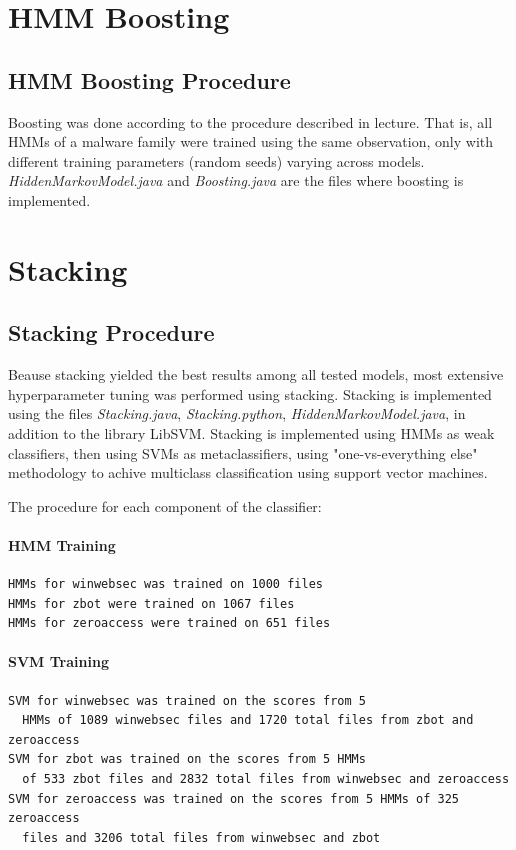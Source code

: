 \documentclass[12pt]{article}
\begin{document}
\section{HMM Boosting}
  \subsection{HMM Boosting Procedure}
  Boosting was done according to the procedure described in lecture. That is, all HMMs of a malware family were trained using the same observation, only with different training parameters (random seeds) varying across models. \textit{HiddenMarkovModel.java} and \textit{Boosting.java} are the files where boosting is implemented.
 
\section{Stacking}
  \subsection{Stacking Procedure}
  Beause stacking yielded the best results among all tested models, most extensive hyperparameter tuning was performed using stacking. Stacking is implemented using the files \textit{Stacking.java}, \textit{Stacking.python}, \textit{HiddenMarkovModel.java}, in addition to the library LibSVM. Stacking is implemented using HMMs as weak classifiers, then using SVMs as metaclassifiers, using "one-vs-everything else"  methodology to achive multiclass classification using support vector machines.

The procedure for each component of the classifier:
\paragraph{HMM Training}
\begin{lstlisting}
HMMs for winwebsec was trained on 1000 files
HMMs for zbot were trained on 1067 files
HMMs for zeroaccess were trained on 651 files
\end{lstlisting}


\paragraph{SVM Training}
\begin{lstlisting}
SVM for winwebsec was trained on the scores from 5 
  HMMs of 1089 winwebsec files and 1720 total files from zbot and zeroaccess
SVM for zbot was trained on the scores from 5 HMMs
  of 533 zbot files and 2832 total files from winwebsec and zeroaccess
SVM for zeroaccess was trained on the scores from 5 HMMs of 325 zeroaccess 
  files and 3206 total files from winwebsec and zbot
\end{lstlisting}
\end{document}
